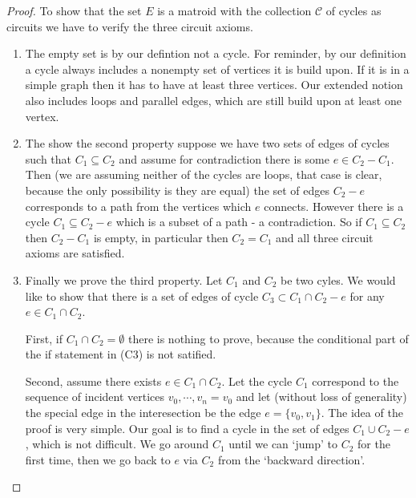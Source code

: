 \begin{proof}

To show that the set $E$ is a matroid with the collection $\mathcal{C}$ of cycles as circuits we have to verify the three circuit axioms. 

\begin{enumerate}

\item The empty set is by our defintion not a cycle. For reminder, by our definition a cycle always includes a nonempty set of vertices it is build upon. If it is in a simple graph then it has to have at least three vertices. Our extended notion also includes loops and parallel edges, which are still build upon at least one vertex. 

\item The show the second property suppose we have two sets of edges of cycles such that $C_1 \subseteq C_2$ and assume for contradiction there is some $e \in C_2 - C_1$. Then (we are assuming neither of the cycles are loops, that case is clear, because the only possibility is they are equal) the set of edges $C_2 - e$ corresponds to a path from the vertices which $e$ connects. However there is a cycle $C_1 \subseteq C_2 -e$ which is a subset of a path - a contradiction. So if $C_1 \subseteq C_2$ then $C_2 - C_1$ is empty, in particular then $C_2 = C_1$ and all three circuit axioms are satisfied.



    
   \item Finally we prove the third property. Let $C_1$ and $C_2$ be two cyles. We would like to show that there is a set of edges of cycle $C_3 \subset C_1 \cap C_2 - e$ for any $e \in C_1 \cap C_2$.

   First, if $C_1 \cap C_2 = \emptyset$ there is nothing to prove, because the conditional part of the if statement in (C3) is not satified.

   
   
   Second, assume there exists $e \in C_1 \cap C_2$. Let the cycle $C_1$ correspond to the sequence of incident vertices  $v_0, \cdots, v_n = v_0$ and let (without loss of generality) the special edge in the interesection be the edge $e = \{v_0, v_1\}$. The idea of the proof is very simple. Our goal is to find a cycle in the set of edges $C_1 \cup C_2 -e$, which is not difficult. We go around $C_1$ until we can `jump' to $C_2$ for the first time, then we go back to $e$ via $C_2$ from the `backward direction'.

   
    

\end{enumerate}
\end{proof}
